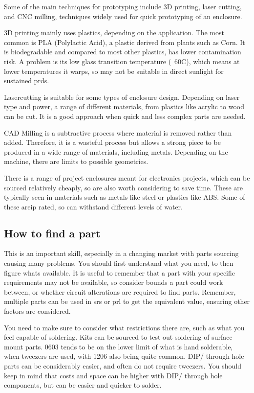 \documentclass[a4paper,11pt]{report}
\begin{document}
Some of the main techniques for prototyping include 3D printing, laser cutting, and CNC milling, techniques widely used for quick prototyping of an enclosure.

3D printing mainly uses plastics, depending on the application. The most common is PLA (Polylactic Acid), a plastic derived from plants such as Corn. It is biodegradable and compared to most other plastics, has lower contamination risk. A problem is its low glass transition temperature (~60\degree C), which means at lower temperatures it warps, so may not be suitable in direct sunlight for sustained \gls{prd}s.

Lasercutting is suitable for some types of enclosure design. Depending on laser type and power, a range of different materials, from plastics like acrylic to wood can be cut. It is a good approach when quick and less complex parts are needed.

CAD Milling is a subtractive process where material is removed rather than added. Therefore, it is a wasteful process but allows a strong piece to be produced in a wide range of materials, including metals. Depending on the machine, there are limits to possible geometries.

There is a range of project enclosures meant for electronics projects, which can be sourced relatively cheaply, so are also worth considering to save time. These are typically seen in materials such as metals like steel or plastics like ABS. Some of these are\gls{ip} rated, so can withstand different levels of water.

\vspace*{1\baselineskip}

\subsection{How to find a part}

This is an important skill, especially in a changing market with parts sourcing causing many problems. You should first understand what you need, to then figure whats available. It is useful to remember that a part with your specific requirements may not be available, so consider bounds a part could work between, or whether circuit alterations are required to find parts. Remember, multiple parts can be used in \gls{srs} or \gls{prl} to get the equivalent value, ensuring other factors are considered.

You need to make sure to consider what restrictions there are, such as what you feel capable of soldering. Kits can be sourced to test out soldering of surface mount parts. 0603 tends to be on the lower limit of what is hand solderable, when tweezers are used, with 1206 also being quite common. DIP/ through hole parts can be considerably easier, and often do not require tweezers. You should keep in mind that costs and space can be higher with DIP/ through hole components, but can be easier and quicker to solder.
\end{document}
